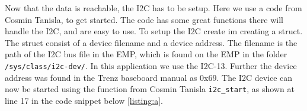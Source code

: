 Now that the data is reachable, the I2C has to be setup. Here we use a code from Cosmin Tanisla\cite{linuxuse66:online}, to get started. The code has some great functions there will handle the I2C, and are easy to use. To setup the I2C create im creating a struct. The struct consist of a device filename and a device address. The filename is the path of the I2C bus file in the EMP, which is found on the EMP in the folder \texttt{/sys/class/i2c-dev/}. In this application we use the I2C-13. Further the device address was found in the Trenz baseboard manual as 0x69. The I2C device can now be started using the function from Cosmin Tanisla \texttt{i2c_start}, as shown at line 17 in the code snippet below \ref{listing:a}.



